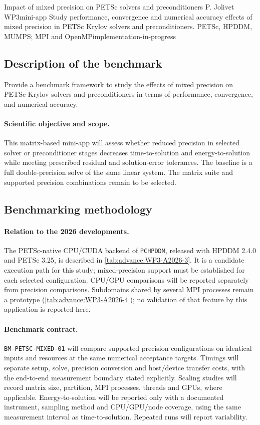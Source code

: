 {Impact of mixed precision on PETSc solvers and preconditioners}
{P. Jolivet}
{WP3}{mini-app}
{Study performance, convergence and numerical accuracy effects of mixed precision in PETSc Krylov solvers and preconditioners.}
{PETSc, HPDDM, MUMPS; MPI and OpenMP}{implementation-in-progress}
\subsection{Description of the benchmark}
Provide a benchmark framework to study the effects of mixed precision on PETSc Krylov solvers and preconditioners in terms of performance, convergence, and numerical accuracy.

\paragraph{Scientific objective and scope.}
This matrix-based mini-app will assess whether reduced precision in selected
solver or preconditioner stages decreases time-to-solution and
energy-to-solution while meeting prescribed residual and solution-error
tolerances. The baseline is a full double-precision solve of the same linear
system. The matrix suite and supported precision combinations remain to be
selected.

\subsection{Benchmarking methodology}


\paragraph{Relation to the 2026 developments.}
The PETSc-native CPU/CUDA backend of \texttt{PCHPDDM}, released with HPDDM 2.4.0
and PETSc 3.25, is described in \cref{tab:advance:WP3-A2026-3}.
It is a candidate execution path for this study; mixed-precision support
must be established for each selected configuration. CPU/GPU comparisons
will be reported separately from precision comparisons. Subdomains shared
by several MPI processes remain a prototype
(\cref{tab:advance:WP3-A2026-4}); no validation of that feature by this
application is reported here.

\paragraph{Benchmark contract.}
\texttt{BM-PETSC-MIXED-01} will compare supported precision configurations
on identical inputs and resources at the same numerical acceptance targets.
Timings will separate setup, solve, precision conversion and host/device
transfer costs, with the end-to-end measurement boundary stated explicitly.
Scaling studies will record matrix size, partition, MPI processes, threads
and GPUs, where applicable. Energy-to-solution will be reported only with a
documented instrument, sampling method and CPU/GPU/node coverage, using the
same measurement interval as time-to-solution. Repeated runs will report
variability.

